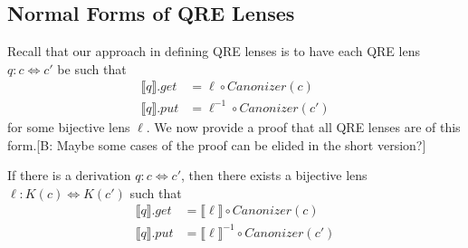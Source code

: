 \documentclass{svproc}
\newcommand{\FINISH}[3]{\ifdraft\textcolor{#1}{[#2: #3]}\fi}
\newcommand{\bcp}[1]{\FINISH{dkred}{B}{#1}}
\newcommand{\canonizer}{\ensuremath{\mathit{Canonizer}}}
\begin{document}
\subsection{Normal Forms of QRE Lenses}
Recall that our approach in defining QRE lenses is to have each QRE lens $q: c
\Leftrightarrow c'$ be such that 
\begin{align*}
  \llbracket q \rrbracket.get &= \ell \circ \canonizer(c)\\
  \llbracket q \rrbracket.put &= \ell^{-1} \circ
                                \canonizer(c')
\end{align*}
for some bijective lens $\ell$. We now provide a proof that all QRE lenses are
of this form.\bcp{Maybe some cases of the proof can be elided in the short
  version?} 
\begin{theorem}\label{normal form}
  If there is a derivation $q : c \Leftrightarrow c'$, then there exists a
  bijective lens $\ell : K(c) \Leftrightarrow K(c')$ such that
  \begin{align*}
    \llbracket q \rrbracket.get &= \llbracket \ell \rrbracket\circ \canonizer(c)\\
    \llbracket q \rrbracket.put &= \llbracket \ell \rrbracket^{-1} \circ
                                  \canonizer(c')
  \end{align*}
\end{theorem}
\end{document}
